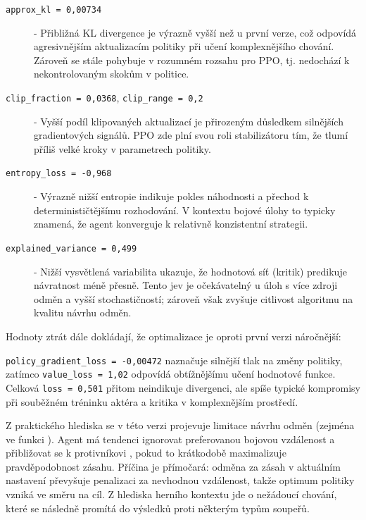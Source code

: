 \begin{description}
    \item[\texttt{approx\_kl = 0{,}00734}] - Přibližná KL divergence je výrazně vyšší než u první verze, což odpovídá agresivnějším aktualizacím politiky při učení komplexnějšího chování. Zároveň se stále pohybuje v rozumném rozsahu pro PPO, tj. nedochází k nekontrolovaným skokům v politice.

    \item[\texttt{clip\_fraction = 0{,}0368}, \texttt{clip\_range = 0{,}2}] - Vyšší podíl klipovaných aktualizací je přirozeným důsledkem silnějších gradientových signálů. PPO zde plní svou roli stabilizátoru tím, že tlumí příliš velké kroky v parametrech politiky.

    \item[\texttt{entropy\_loss = -0{,}968}] - Výrazně nižší entropie indikuje pokles náhodnosti a přechod k determinističtějšímu rozhodování. V kontextu bojové úlohy to typicky znamená, že agent konverguje k relativně konzistentní strategii.

    \item[\texttt{explained\_variance = 0{,}499}] - Nižší vysvětlená variabilita ukazuje, že hodnotová síť (kritik) predikuje návratnost méně přesně. Tento jev je očekávatelný u úloh s více zdroji odměn a vyšší stochastičností; zároveň však zvyšuje citlivost algoritmu na kvalitu návrhu odměn.
\end{description}

\newpage

Hodnoty ztrát dále dokládají, že optimalizace je oproti první verzi náročnější: 

\texttt{policy\_gradient\_loss = -0{,}00472} naznačuje silnější tlak na změny politiky, zatímco \texttt{value\_loss = 1{,}02} odpovídá obtížnějšímu učení hodnotové funkce. Celková \texttt{loss = 0{,}501} přitom neindikuje divergenci, ale spíše typické kompromisy při souběžném tréninku aktéra a kritika v komplexnějším prostředí.

Z praktického hlediska se v této verzi projevuje limitace návrhu odměn (zejména ve funkci ). Agent má tendenci ignorovat preferovanou bojovou vzdálenost a přibližovat se k protivníkovi , pokud to krátkodobě maximalizuje pravděpodobnost zásahu. Příčina je přímočará: odměna za zásah v aktuálním nastavení převyšuje penalizaci za nevhodnou vzdálenost, takže optimum politiky vzniká ve směru  na cíl. Z hlediska herního kontextu jde o nežádoucí chování, které se následně promítá do výsledků proti některým typům soupeřů.

